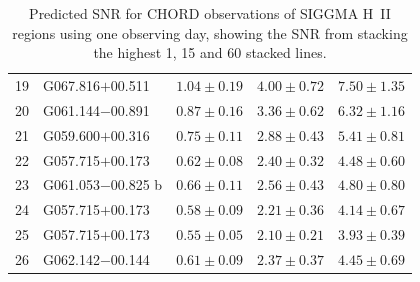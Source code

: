 \begin{table}[H]
\begin{tabular}{l l c c c}
        19 & G067.816$+$00.511 & $1.04 \pm 0.19$ & $4.00 \pm 0.72$ & $7.50 \pm 1.35$ \\
        20 & G061.144$-$00.891 & $0.87 \pm 0.16$ & $3.36 \pm 0.62$ & $6.32 \pm 1.16$ \\
        21 & G059.600$+$00.316 & $0.75 \pm 0.11$ & $2.88 \pm 0.43$ & $5.41 \pm 0.81$ \\
        22 & G057.715$+$00.173 & $0.62 \pm 0.08$ & $2.40 \pm 0.32$ & $4.48 \pm 0.60$ \\
        23 & G061.053$-$00.825 b & $0.66 \pm 0.11$ & $2.56 \pm 0.43$ & $4.80 \pm 0.80$ \\
        24 & G057.715$+$00.173 & $0.58 \pm 0.09$ & $2.21 \pm 0.36$ & $4.14 \pm 0.67$ \\
        25 & G057.715$+$00.173 & $0.55 \pm 0.05$ & $2.10 \pm 0.21$ & $3.93 \pm 0.39$ \\
        26 & G062.142$-$00.144 & $0.61 \pm 0.09$ & $2.37 \pm 0.37$ & $4.45 \pm 0.69$ \\
        \bottomrule
    \end{tabular}
    \caption{Predicted SNR for CHORD observations of SIGGMA H~II regions using one observing day, showing the SNR from stacking the highest 1, 15 and 60 stacked lines.}
    \label{tab:siggma_stacked_snr}
\end{table}
